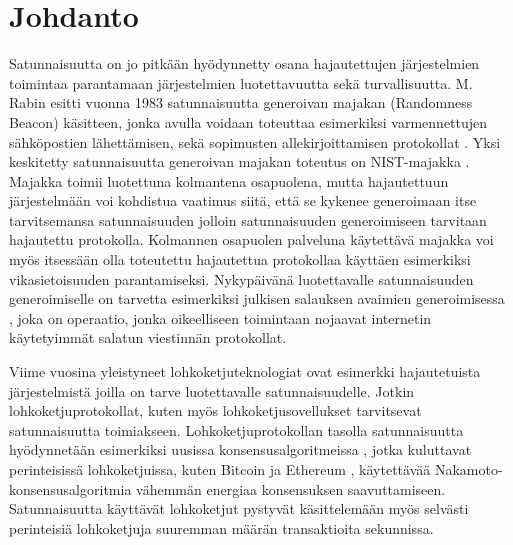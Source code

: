 \chapter{Johdanto\label{intro}}

Satunnaisuutta on jo pitkään hyödynnetty osana hajautettujen järjestelmien toimintaa parantamaan järjestelmien luotettavuutta sekä turvallisuutta. M. Rabin esitti vuonna 1983 satunnaisuutta generoivan majakan (Randomness Beacon) käsitteen, jonka avulla voidaan toteuttaa esimerkiksi varmennettujen sähköpostien lähettämisen, sekä sopimusten allekirjoittamisen protokollat \cite{rabin_transaction_1983}. Yksi keskitetty satunnaisuutta generoivan majakan toteutus on NIST-majakka \cite{computer_security_division_interoperable_2019}. Majakka toimii luotettuna kolmantena osapuolena, mutta hajautettuun järjestelmään voi kohdistua vaatimus siitä, että se kykenee generoimaan itse tarvitsemansa satunnaisuuden jolloin satunnaisuuden generoimiseen tarvitaan hajautettu protokolla. Kolmannen osapuolen palveluna käytettävä majakka voi myös itsessään olla toteutettu hajautettua protokollaa käyttäen esimerkiksi vikasietoisuuden parantamiseksi. Nykypäivänä luotettavalle satunnaisuuden generoimiselle on tarvetta esimerkiksi julkisen salauksen avaimien generoimisessa \cite{corrigan-gibbs_ensuring_2014}, joka on operaatio, jonka oikeelliseen toimintaan nojaavat internetin käytetyimmät salatun viestinnän protokollat. 

Viime vuosina yleistyneet lohkoketjuteknologiat ovat esimerkki hajautetuista järjestelmistä joilla on tarve luotettavalle satunnaisuudelle. Jotkin lohkoketjuprotokollat, kuten myös lohkoketjusovellukset tarvitsevat satunnaisuutta toimiakseen. Lohkoketjuprotokollan tasolla satunnaisuutta hyödynnetään esimerkiksi uusissa konsensusalgoritmeissa \cite{gilad_algorand_2017, hanke_dfinity_2018}, jotka kuluttavat perinteisissä lohkoketjuissa, kuten Bitcoin \cite{noauthor_bitcoin_nodate} ja Ethereum \cite{noauthor_ethereum_nodate}, käytettävää Nakamoto-konsensusalgoritmia vähemmän energiaa konsensuksen saavuttamiseen. Satunnaisuutta käyttävät lohkoketjut pystyvät käsittelemään myös selvästi perinteisiä lohkoketjuja suuremman määrän transaktioita sekunnissa.

